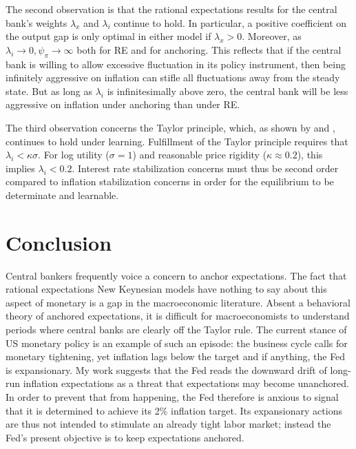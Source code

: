 \documentclass[11pt]{article}
\renewcommand{\[}{\begin{equation}}
\renewcommand{\]}{\end{equation}}
\begin{document}
The second observation is that the rational expectations results for the central bank's weights $\lambda_x$ and $\lambda_i$ continue to hold. In particular, a positive coefficient on the output gap is only optimal in either model if $\lambda_x > 0$. Moreover, as $\lambda_i \rightarrow 0, \psi_{\pi} \rightarrow \infty$ both for RE and for anchoring. This reflects that if the central bank is willing to allow excessive fluctuation in its policy instrument, then being infinitely aggressive on inflation can stifle all fluctuations away from the steady state. But as long as $\lambda_i$ is infinitesimally above zero, the central bank will be less aggressive on inflation under anchoring than under RE. 

The third observation concerns the Taylor principle, which, as shown by \cite{bullard2002learning} and \cite{preston2005}, continues to hold under learning. Fulfillment of the Taylor principle requires that $\lambda_i < \kappa\sigma$. For log utility ($\sigma=1$) and reasonable price rigidity ($\kappa \approx 0.2$), this implies $\lambda_i < 0.2$. Interest rate stabilization concerns must thus be second order compared to inflation stabilization concerns in order for the equilibrium to be determinate and learnable.








\section{Conclusion}\label{conclusion}
Central bankers frequently voice a concern to anchor expectations. The fact that rational expectations New Keynesian models have nothing to say about this aspect of monetary is a gap in the macroeconomic literature. Absent a behavioral theory of anchored expectations, it is difficult for macroeconomists to understand periods where central banks are clearly off the Taylor rule. The current stance of US monetary policy is an example of such an episode: the business cycle calls for monetary tightening, yet inflation lags below the target and if anything, the Fed is expansionary. My work suggests that the Fed reads the downward drift of long-run inflation expectations as a threat that expectations may become unanchored. In order to prevent that from happening, the Fed therefore is anxious to signal that it is determined to achieve its 2\% inflation target. Its expansionary actions are thus not intended to stimulate an already tight labor market; instead the Fed's present objective is to keep expectations anchored. 
\end{document}
